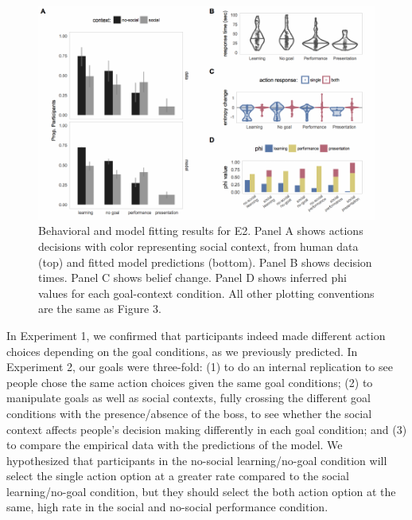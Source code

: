 \documentclass[10pt, letterpaper]{article}
\newenvironment{CodeChunk}{}{}
\begin{document}
\begin{CodeChunk}
\begin{figure}[tb]

{\centering \includegraphics[width=0.95\linewidth]{figs/e2_results-1} 

}

\caption[Behavioral and model fitting results for E2]{Behavioral and model fitting results for E2. Panel A shows actions decisions with color representing social context, from human data (top) and fitted model predictions (bottom). Panel B shows decision times. Panel C shows belief change. Panel D shows inferred phi values for each goal-context condition. All other plotting conventions are the same as Figure 3.}\label{fig:e2_results}
\end{figure}
\end{CodeChunk}

In Experiment 1, we confirmed that participants indeed made different
action choices depending on the goal conditions, as we previously
predicted. In Experiment 2, our goals were three-fold: (1) to do an
internal replication to see people chose the same action choices given
the same goal conditions; (2) to manipulate goals as well as social
contexts, fully crossing the different goal conditions with the
presence/absence of the boss, to see whether the social context affects
people's decision making differently in each goal condition; and (3) to
compare the empirical data with the predictions of the model. We
hypothesized that participants in the no-social learning/no-goal
condition will select the single action option at a greater rate
compared to the social learning/no-goal condition, but they should
select the both action option at the same, high rate in the social and
no-social performance condition.
\end{document}
